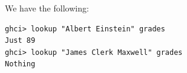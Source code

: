 We have the following:
\begin{lstlisting}
ghci> lookup "Albert Einstein" grades
Just 89
ghci> lookup "James Clerk Maxwell" grades
Nothing
\end{lstlisting}
